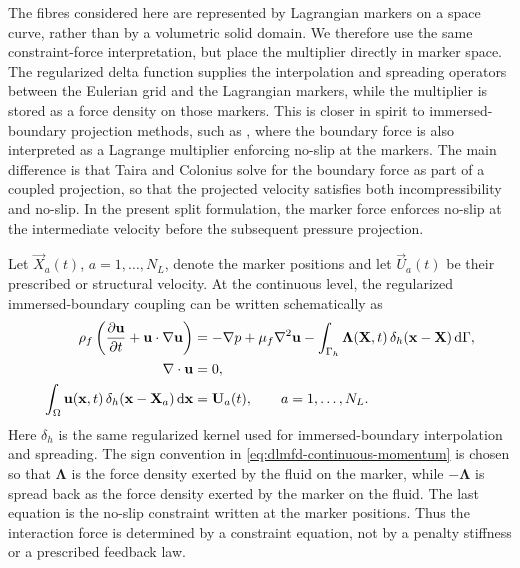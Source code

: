 The fibres considered here are represented by Lagrangian markers on a space
curve, rather than by a volumetric solid domain. We therefore use the same
constraint-force interpretation, but place the multiplier directly in marker
space. The regularized delta function supplies the interpolation and spreading
operators between the Eulerian grid and the Lagrangian markers, while the
multiplier is stored as a force density on those markers. This is closer in
spirit to immersed-boundary projection methods, such as
\textcite{taira_immersed_2007}, where the boundary force is also interpreted as
a Lagrange multiplier enforcing no-slip at the markers. The main difference is
that Taira and Colonius solve for the boundary force as part of a coupled
projection, so that the projected velocity satisfies both incompressibility and
no-slip. In the present split formulation, the marker force enforces no-slip at
the intermediate velocity before the subsequent pressure projection.

Let \(\vec X_a(t)\), \(a=1,\ldots,N_L\), denote the marker positions and let
\(\vec U_a(t)\) be their prescribed or structural velocity. At the continuous
level, the regularized immersed-boundary coupling can be written schematically
as
\begin{align}
    \rho_f\left(\pdv{\vec u}{t}+\vec u\cdot\nabla\vec u\right)
                      & = -\nabla p + \mu_f\nabla^2\vec u
    -\int_{\Gamma_h}\bm\Lambda(\vec X,t)\,
    \delta_h(\vec x-\vec X)\odif{\Gamma},
    \label{eq:dlmfd-continuous-momentum}                  \\
    \nabla\cdot\vec u & = 0,
    \label{eq:dlmfd-continuous-incompressibility}         \\
    \int_{\Omega}\vec u(\vec x,t)\,
    \delta_h(\vec x-\vec X_a)\odif{\vec x}
                      & = \vec U_a(t),
    \qquad a=1,\ldots,N_L .
    \label{eq:dlmfd-continuous-constraint}
\end{align}
Here \(\delta_h\) is the same regularized kernel used for immersed-boundary
interpolation and spreading. The sign convention in
\eqref{eq:dlmfd-continuous-momentum} is chosen so that
\(\bm\Lambda\) is the force density exerted by the fluid on the marker, while
\(-\bm\Lambda\) is spread back as the force density exerted by the marker on
the fluid. The last equation is the no-slip constraint written at the marker
positions. Thus the interaction force is determined by a constraint equation,
not by a penalty stiffness or a prescribed feedback law.

